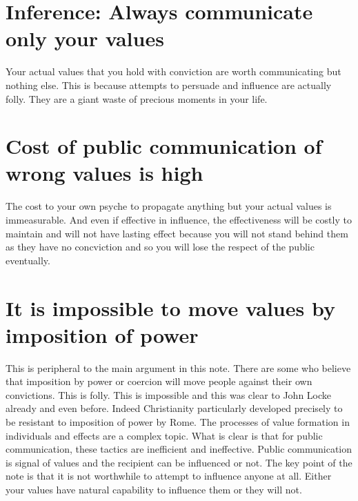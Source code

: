 \documentclass{amsart}
\begin{document}
\section{Inference:  Always communicate only your values}
Your actual values that you hold with conviction are worth communicating but nothing else.  This is because attempts to persuade and influence are actually folly.  They are a giant waste of precious moments in your life.

\section{Cost of public communication of wrong values is high}
The cost to your own psyche to propagate anything but your actual values is immeasurable.  And even if effective in influence, the effectiveness will be costly to maintain and will not have lasting effect because you will not stand behind them as they have no concviction and so you will lose the respect of the public eventually.

\section{It is impossible to move values by imposition of power}

This is peripheral to the main argument in this note.  There are some who believe that imposition by power or coercion will move people against their own convictions.  This is folly.  This is impossible and this was clear to John Locke already and even before.  Indeed Christianity particularly developed precisely to be resistant to imposition of power by Rome.  The processes of value formation in individuals and effects are a complex topic.  What is clear is that for public communication, these tactics are inefficient and ineffective.  Public communication is signal of values and the recipient can be influenced or not.  The key point of the note is that it is not worthwhile to attempt to influence anyone at all.  Either your values have natural capability to influence them or they will not. 
\end{document}
